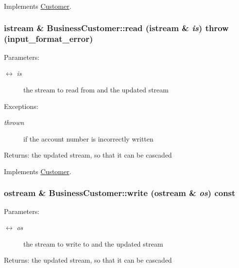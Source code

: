 Implements \hyperlink{classCustomer_406fb74a887e5f0eb91aa49301534bb4}{Customer}.\hypertarget{classBusinessCustomer_2c5cee8ad65d72e620a32f10e99b823d}{
\subsubsection[read]{\setlength{\rightskip}{0pt plus 5cm}istream \& BusinessCustomer::read (istream \& {\em is})  throw (input\_\-format\_\-error)}}
\label{classBusinessCustomer_2c5cee8ad65d72e620a32f10e99b823d}


\begin{Desc}
\item[Parameters:]
\begin{description}
\item[\mbox{$\leftrightarrow$} {\em is}]the stream to read from and the updated stream \end{description}
\end{Desc}
\begin{Desc}
\item[Exceptions:]
\begin{description}
\item[{\em thrown}]if the account number is incorrectly written \end{description}
\end{Desc}
\begin{Desc}
\item[Returns:]the updated stream, so that it can be cascaded \end{Desc}


Implements \hyperlink{classCustomer_3327c4e5e7f3a9435f3b71372778386a}{Customer}.\hypertarget{classBusinessCustomer_2ea38f4b72488c8e9d7f7c38ed93b454}{
\subsubsection[write]{\setlength{\rightskip}{0pt plus 5cm}ostream \& BusinessCustomer::write (ostream \& {\em os}) const}}
\label{classBusinessCustomer_2ea38f4b72488c8e9d7f7c38ed93b454}


\begin{Desc}
\item[Parameters:]
\begin{description}
\item[\mbox{$\leftrightarrow$} {\em os}]the stream to write to and the updated stream \end{description}
\end{Desc}
\begin{Desc}
\item[Returns:]the updated stream, so that it can be cascaded \end{Desc}


